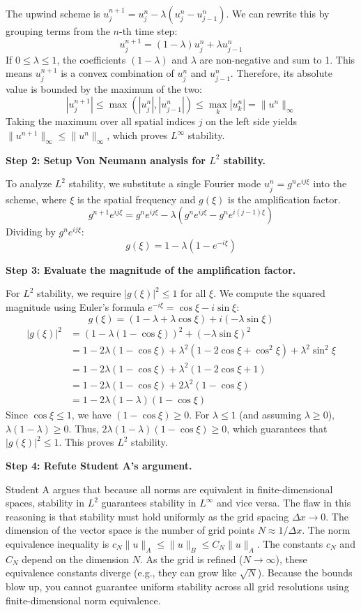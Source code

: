 \begin{solution}
The upwind scheme is $u_j^{n+1} = u_j^n - \lambda(u_j^n - u_{j-1}^n)$.
We can rewrite this by grouping terms from the $n$-th time step:
\[ u_j^{n+1} = (1-\lambda)u_j^n + \lambda u_{j-1}^n \]
If $0 \leq \lambda \leq 1$, the coefficients $(1-\lambda)$ and $\lambda$ are non-negative and sum to 1. This means $u_j^{n+1}$ is a convex combination of $u_j^n$ and $u_{j-1}^n$.
Therefore, its absolute value is bounded by the maximum of the two:
\[ |u_j^{n+1}| \leq \max(|u_j^n|, |u_{j-1}^n|) \leq \max_k |u_k^n| = \|u^n\|_\infty \]
Taking the maximum over all spatial indices $j$ on the left side yields $\|u^{n+1}\|_\infty \leq \|u^n\|_\infty$, which proves $L^\infty$ stability.

\textbf{Step 2: Setup Von Neumann analysis for $L^2$ stability.}

To analyze $L^2$ stability, we substitute a single Fourier mode $u_j^n = g^n e^{i j \xi}$ into the scheme, where $\xi$ is the spatial frequency and $g(\xi)$ is the amplification factor.
\[ g^{n+1} e^{i j \xi} = g^n e^{i j \xi} - \lambda(g^n e^{i j \xi} - g^n e^{i (j-1) \xi}) \]
Dividing by $g^n e^{i j \xi}$:
\[ g(\xi) = 1 - \lambda(1 - e^{-i\xi}) \]

\textbf{Step 3: Evaluate the magnitude of the amplification factor.}

For $L^2$ stability, we require $|g(\xi)|^2 \leq 1$ for all $\xi$.
We compute the squared magnitude using Euler's formula $e^{-i\xi} = \cos\xi - i\sin\xi$:
\[ g(\xi) = (1 - \lambda + \lambda \cos\xi) + i(-\lambda \sin\xi) \]
\begin{align*}
|g(\xi)|^2 &= (1 - \lambda(1 - \cos\xi))^2 + (-\lambda \sin\xi)^2 \\
&= 1 - 2\lambda(1 - \cos\xi) + \lambda^2(1 - 2\cos\xi + \cos^2\xi) + \lambda^2 \sin^2\xi \\
&= 1 - 2\lambda(1 - \cos\xi) + \lambda^2(1 - 2\cos\xi + 1) \\
&= 1 - 2\lambda(1 - \cos\xi) + 2\lambda^2(1 - \cos\xi) \\
&= 1 - 2\lambda(1-\lambda)(1-\cos\xi)
\end{align*}
Since $\cos\xi \leq 1$, we have $(1-\cos\xi) \geq 0$. For $\lambda \leq 1$ (and assuming $\lambda \geq 0$), $\lambda(1-\lambda) \geq 0$.
Thus, $2\lambda(1-\lambda)(1-\cos\xi) \geq 0$, which guarantees that $|g(\xi)|^2 \leq 1$. This proves $L^2$ stability.

\textbf{Step 4: Refute Student A's argument.}

Student A argues that because all norms are equivalent in finite-dimensional spaces, stability in $L^2$ guarantees stability in $L^\infty$ and vice versa.
The flaw in this reasoning is that stability must hold uniformly as the grid spacing $\Delta x \to 0$. The dimension of the vector space is the number of grid points $N \approx 1/\Delta x$.
The norm equivalence inequality is $c_N \|u\|_A \leq \|u\|_B \leq C_N \|u\|_A$.
The constants $c_N$ and $C_N$ depend on the dimension $N$. As the grid is refined ($N \to \infty$), these equivalence constants diverge (e.g., they can grow like $\sqrt{N}$). Because the bounds blow up, you cannot guarantee uniform stability across all grid resolutions using finite-dimensional norm equivalence.
\end{solution}

